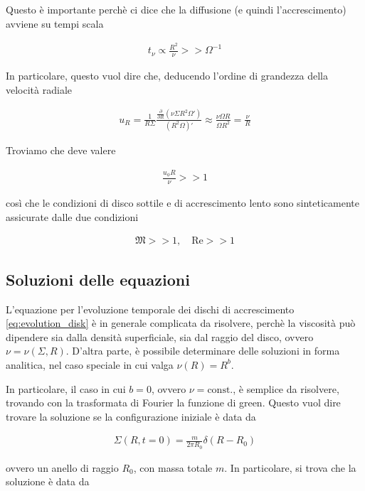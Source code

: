 \documentclass{report}
\begin{document}
Questo è importante perchè ci dice che la diffusione (e quindi l'accrescimento) avviene su tempi scala

\begin{align}
    t_{\nu} \propto \frac{R^2}{\nu} >> \Omega^{-1}
\end{align}

In particolare, questo vuol dire che, deducendo l'ordine di grandezza della velocità radiale 

\begin{align}
    u_R = \frac{1}{R\Sigma}\frac{\frac{\partial}{\partial R}(\nu\Sigma R^2 \Omega')}{(R^2\Omega)'} \approx \frac{\nu \Omega R}{\Omega R^2} = \frac{\nu}{R}
\end{align}

Troviamo che deve valere 

\begin{align}
    \frac{u_\phi R}{\nu} >> 1
\end{align}

così che le condizioni di disco sottile e di accrescimento lento sono sinteticamente assicurate dalle due condizioni 

\begin{align}
    \mathfrak{M} >> 1, \quad \text{Re} >> 1
\end{align}

\subsection{Soluzioni delle equazioni}

L'equazione per l'evoluzione temporale dei dischi di accrescimento \ref{eq:evolution_disk} è in generale complicata da risolvere, perchè la viscosità può dipendere sia dalla densità superficiale, sia dal raggio del disco, ovvero \(\nu = \nu(\Sigma, R)\). D'altra parte, è possibile determinare delle soluzioni in forma analitica, nel caso speciale in cui valga \(\nu(R) = R^b\). 

In particolare, il caso in cui \(b=0\), ovvero \(\nu = \text{const.}\), è semplice da risolvere, trovando con la trasformata di Fourier la funzione di green. Questo vuol dire trovare la soluzione se la configurazione iniziale è data da 

\begin{align}
    \Sigma(R, t=0) = \frac{m}{2\pi R_0}\delta(R-R_0)
\end{align}

ovvero un anello di raggio \(R_0\), con massa totale \(m\). In particolare, si trova che la soluzione è data da 
\end{document}
